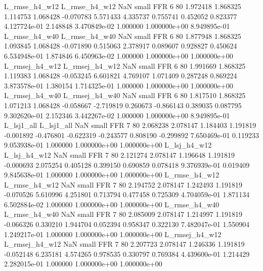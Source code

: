  L_rmse_h4_w12  L_rmse_h4_w12                   NaN      small      FFR                 6 80 1.972418       1.868325 1.114753       1.068428   -0.070783      5.571433      4.335737     0.755741       0.452052  0.823377 4.127724e-01     2.148848   3.470849e-02            1.000000    1.000000e+00        8.949895e-01
 L_rmse_h4_w40  L_rmse_h4_w40                   NaN      small      FFR                 6 80 1.877948       1.868325 1.093845       1.068428   -0.071890      0.515063      2.378917     0.089607       0.928827  0.450624 6.534948e-01     1.874846   6.450963e-02            1.000000    1.000000e+00        1.000000e+00
L_rmsej_h4_w12 L_rmsej_h4_w12                   NaN      small      FFR                 6 80 1.991669       1.868325 1.119383       1.068428   -0.053245      6.601821      4.769107     1.071409       0.287248  0.869224 3.873578e-01     1.380154   1.714325e-01            1.000000    1.000000e+00        1.000000e+00
L_rmsej_h4_w40 L_rmsej_h4_w40                   NaN      small      FFR                 6 80 1.817510       1.868325 1.071213       1.068428   -0.058667     -2.719819      0.260673    -0.866143       0.389035  0.087795 9.302620e-01     2.152346   3.442267e-02            1.000000    1.000000e+00        8.949895e-01
    L_lsj1_all     L_lsj1_all                   NaN      small      FFR                 7 80 2.068238       2.078147 1.184403       1.191819   -0.001892     -0.476801     -0.622319    -0.243577       0.808190 -0.299892 7.650469e-01     0.119233   9.053938e-01            1.000000    1.000000e+00        1.000000e+00
  L_lsj_h4_w12   L_lsj_h4_w12                   NaN      small      FFR                 7 80 2.121274       2.078147 1.196648       1.191819   -0.000693      2.075254      0.405128     0.399150       0.690859  0.078418 9.376939e-01     0.019409   9.845638e-01            1.000000    1.000000e+00        1.000000e+00
 L_rmse_h4_w12  L_rmse_h4_w12                   NaN      small      FFR                 7 80 2.194752       2.078147 1.242493       1.191819   -0.070526      5.610996      4.251801     0.713794       0.477458  0.725309 4.704059e-01     1.871134   6.502884e-02            1.000000    1.000000e+00        1.000000e+00
 L_rmse_h4_w40  L_rmse_h4_w40                   NaN      small      FFR                 7 80 2.085009       2.078147 1.214997       1.191819   -0.066326      0.330210      1.944704     0.052394       0.958347  0.322130 7.482047e-01     1.550904   1.249217e-01            1.000000    1.000000e+00        1.000000e+00
L_rmsej_h4_w12 L_rmsej_h4_w12                   NaN      small      FFR                 7 80 2.207723       2.078147 1.246336       1.191819   -0.052148      6.235181      4.574265     0.978535       0.330797  0.769384 4.439600e-01     1.214429   2.282015e-01            1.000000    1.000000e+00        1.000000e+00
